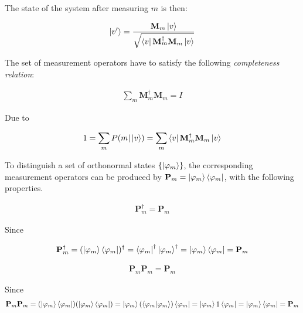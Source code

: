 The state of the system after measuring $m$ is then:

\begin{align*}
    \ket{v'} = \frac{\mathbf{M}_m\ket{v}}{\sqrt{\bra{v} \mathbf{M}_m^{\dagger} \mathbf{M}_m \ket{v}}}
\end{align*}

The set of measurement operators have to satisfy the following \textit{completeness relation}:

\begin{align*}
    \sum\limits_{m}  \mathbf{M}_m^{\dagger} \mathbf{M}_m = I
\end{align*}

Due to

\begin{align*}
    1 = \sum\limits_{m} P(m | \ket{v}) = \sum\limits_{m} \bra{v} \mathbf{M}_m^{\dagger} \mathbf{M}_m \ket{v}
\end{align*}

\label{PostulateIIIProjective}

To distinguish a set of orthonormal states $\{\ket{\varphi_m}\}$, the corresponding measurement operators can be produced by $\mathbf{P}_m = \ket{\varphi_m}\bra{\varphi_m}$, with the following properties.

\begin{property}

\begin{align*}
\mathbf{P}_m^{\dagger} = \mathbf{P}_m
\end{align*}

Since

\begin{align*}
\mathbf{P}_m^{\dagger} =
(\ket{\varphi_m}\bra{\varphi_m})^{\dagger} =
\bra{\varphi_m}^{\dagger}\ket{\varphi_m}^{\dagger} =
\ket{\varphi_m}\bra{\varphi_m} =
\mathbf{P}_m
\end{align*}

\end{property}

\begin{property}

\begin{align*}
\mathbf{P}_m\mathbf{P}_m = \mathbf{P}_m
\end{align*}

Since
\begin{align*}
\mathbf{P}_m\mathbf{P}_m =
(\ket{\varphi_m}\bra{\varphi_m})(\ket{\varphi_m}\bra{\varphi_m}) =
\ket{\varphi_m}(\bra{\varphi_m}\ket{\varphi_m})\bra{\varphi_m} =
\ket{\varphi_m}1\bra{\varphi_m} =
\ket{\varphi_m}\bra{\varphi_m} =
\mathbf{P}_m
\end{align*}

\end{property}

